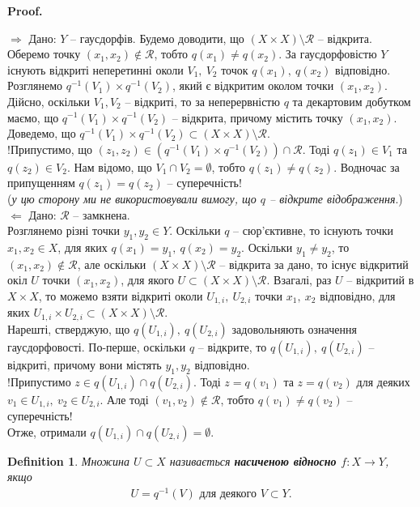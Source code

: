 \documentclass[a4paper, 10pt]{article}
\makeatletter
\def\rightproof{$\boxed{\Rightarrow}$ }
\def\leftproof{$\boxed{\Leftarrow}$ }
\theoremstyle{theoremdd}
\newtheorem{definition}[theorem]{Definition}
\renewenvironment{proof}[1][Proof.\\]{\par
\pushQED{\hfill \qed}%
\normalfont \topsep6\p@\@plus6\p@\relax
\trivlist
\item\relax
{\bfseries
#1\@addpunct{.}}\hspace\labelsep\ignorespaces
}{%
\popQED\endtrivlist\@endpefalse
}
\makeatother
\begin{document}
\begin{proof}
\rightproof Дано: $Y$ -- гаусдорфів. Будемо доводити, що $(X \times X) \setminus \mathcal{R}$ -- відкрита.\\
Оберемо точку $(x_1,x_2) \notin \mathcal{R}$, тобто $q(x_1) \neq q(x_2)$. За гаусдорфовістю $Y$ існують відкриті неперетинні околи $V_1,\ V_2$ точок $q(x_1),\ q(x_2)$ відповідно. Розглянемо $q^{-1}(V_1) \times q^{-1}(V_2)$, який є відкритим околом точки $(x_1,x_2)$. Дійсно, оскільки $V_1,V_2$ -- відкриті, то за неперервністю $q$ та декартовим добутком маємо, що $q^{-1}(V_1) \times q^{-1}(V_2)$ -- відкрита, причому містить точку $(x_1,x_2)$. Доведемо, що $q^{-1}(V_1) \times q^{-1}(V_2) \subset (X \times X) \setminus \mathcal{R}$.\\
!Припустимо, що $(z_1,z_2) \in (q^{-1}(V_1) \times q^{-1}(V_2)) \cap \mathcal{R}$. Тоді $q(z_1) \in V_1$ та $q(z_2) \in V_2$. Нам відомо, що $V_1 \cap V_2 = \emptyset$, тобто $q(z_1) \neq q(z_2)$. Водночас за припущенням  $q(z_1) = q(z_2)$ -- суперечність!\\
(\textit{у цю сторону ми не використовували вимогу, що $q$ -- відкрите відображення}.)
\bigskip \\
\leftproof Дано: $\mathcal{R}$ -- замкнена.\\
Розглянемо різні точки $y_1,y_2 \in Y$. Оскільки $q$ -- сюр'єктивне, то існують точки $x_1,x_2 \in X$, для яких $q(x_1) = y_1,\ q(x_2) = y_2$. Оскільки $y_1 \neq y_2$, то $(x_1,x_2) \notin \mathcal{R}$, але оскільки $(X \times X) \setminus \mathcal{R}$ -- відкрита за дано, то існує відкритий окіл $U$ точки $(x_1,x_2)$, для якого $U \subset (X \times X) \setminus \mathcal{R}$. Взагалі, раз $U$ -- відкритий в $X \times X$, то можемо взяти відкриті околи $U_{1,i},\ U_{2,i}$ точки $x_1,\ x_2$ відповідно, для яких $U_{1,i} \times U_{2,i} \subset (X \times X) \setminus \mathcal{R}$.\\
Нарешті, стверджую, що $q(U_{1,i}),\ q(U_{2,i})$ задовольняють означення гаусдорфовості. По-перше, оскільки $q$ -- відкрите, то $q(U_{1,i}),\ q(U_{2,i})$ -- відкриті, причому вони містять $y_1,y_2$ відповідно.\\
!Припустимо $z \in q(U_{1,i}) \cap q(U_{2,i})$. Тоді $z = q(v_1)$ та $z = q(v_2)$ для деяких $v_1 \in U_{1,i},\ v_2 \in U_{2,i}$. Але тоді $(v_1,v_2) \notin \mathcal{R}$, тобто $q(v_1) \neq q(v_2)$ -- суперечність!\\
Отже, отримали $q(U_{1,i}) \cap q(U_{2,i}) = \emptyset$.
\end{proof}

\begin{definition}
Множина $U \subset X$ називається \textbf{насиченою відносно $f \colon X \to Y$}, якщо
\begin{align*}
U = q^{-1}(V) \text{ для деякого } V \subset Y.
\end{align*}
\end{definition}
\end{document}
